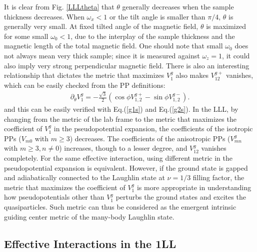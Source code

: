 \documentclass[twocolumn,showpacs,amsmath,amstex,amssymb,mathfonts,prb]{revtex4-1}
\begin{document}
It is clear from Fig. \ref{LLLtheta} that $\theta$ generally decreases when the sample thickness decreases. When $\omega_x<1$ or the tilt angle is smaller than $\pi/4$, $\theta$ is generally very small. At fixed tilted angle of the magnetic field, $\theta$ is maximized for some small $\omega_0<1$, due to the interplay of the sample thickness and the magnetic length of the total magnetic field. One should note that small $\omega_0$ does not always mean very thick sample; since it is measured against $\omega_z=1$, it could also imply very strong perpendicular magnetic field. There is also an interesting relationship that dictates the metric that maximizes $V^g_1$ also makes $V^{g+}_{12}$ vanishes, which can be easily checked from the PP definitions:
 \begin{eqnarray}\label{relationship}
 \partial_\theta V_{1}^g=-\frac{\sqrt{3}}{2} \left( \cos\phi V_{1,2}^{g+} - \sin\phi V_{1,2}^{g-}\right).
 \end{eqnarray}
and this can be easily verified with Eq.(\ref{g1s}) and Eq.(\ref{g2s}). In the LLL, by changing from the metric of the lab frame to the metric that maximizes the coefficient of $V_1^g$ in the pseudopotential expansion, the coefficients of the isotropic PPs ($V_{m0}$ with $m\ge 3$) decreases. The coefficients of the anisotropic PPs ($V^g_{mn}$ with $m\ge 3, n\ne 0$) increases, though to a lesser degree, and $V^g_{12}$ vanishes completely. For the same effective interaction, using different metric in the pseudopotential expansion is equivalent. However, if the ground state is gapped and adiabatically connected to the Laughlin state at $\nu=1/3$ filling factor, the metric that maximizes the coefficient of $V^g_1$ is more appropriate in understanding how pseudopotentials other than $V^g_1$ perturbs the ground states and excites the quasiparticles. Such metric can thus be considered as the emergent intrinsic guiding center metric of the many-body Laughlin state.

\subsection{Effective Interactions in the 1LL}\label{1LL_description}
\end{document}
